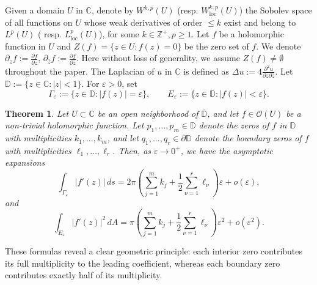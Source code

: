 \documentclass[12pt,twoside]{amsart}
\numberwithin{equation}{section}
\newtheorem{theorem}{Theorem}[section]
\numberwithin{definition}{section} %
\begin{document}
Given a domain $U$ in $\mathbb{C}$,  denote by $W ^{k,p}(U) $ (resp. $W_{\mathrm{loc}}^{k,p}(U)$) the Sobolev space of all functions on  $U$ whose weak derivatives of order $\leq k$ exist and belong to $L^p(U)$ (  resp. $L_{\mathrm{loc}}^p(U)$),   for some $k\in \mathbb{Z}^+,  p\geq 1$. Let $f$ be a holomorphic function in $U$  and $Z(f)= \{z \in U:  f(z) =0 \}$ be the zero set of $f$. We denote $ \partial_z f := \frac{\partial f}{\partial z}$,  $ \partial_{\bar{z}} f := \frac{\partial f}{\partial \bar{z}}$.   Here without loss of generality, we assume $Z(f) \neq \emptyset$ throughout the paper. The Laplacian of $u$ in $\mathbb{C}$ is defined as $\Delta u := 4 \frac{\partial^2 u}{\partial z \partial \bar{z}}.$ Let $\mathbb{D} := \{ z \in \mathbb{C} : |z| < 1 \}$. For $\varepsilon > 0$, set
$$
\Gamma_{\varepsilon} := \{z \in \mathbb{D} : |f(z)| = \varepsilon\}, \qquad
E_{\varepsilon} := \{z \in \mathbb{D} : |f(z)| < \varepsilon\}.
$$

\begin{theorem}\label{thm3.2}
Let $U \subset \mathbb{C}$ be an open neighborhood of $\overline{\mathbb{D}}$, and let $f \in \mathcal{O}(U)$ be a non-trivial holomorphic function. Let $p_1, \dots, p_m \in \mathbb{D}$ denote the zeros of $f$ in $\mathbb{D}$ with multiplicities $k_1, \dots, k_m$, and let $q_1, \dots, q_r \in \partial\mathbb{D}$ denote the boundary zeros of $f$ with multiplicities $\ell_1, \dots, \ell_r$. 
Then, as $\varepsilon \to 0^+$, we have the asymptotic expansions
\begin{equation}\label{eq:level-set-asymptotic}
\int_{\Gamma_{\varepsilon}} |f'(z)|\,ds = 2\pi \left( \sum_{j=1}^{m} k_{j} + \frac{1}{2} \sum_{\nu=1}^{r} \ell_{\nu} \right) \varepsilon + o(\varepsilon),
\end{equation}
and
\begin{equation}\label{eq:sublevel-energy-asymptotic}
\int_{E_{\varepsilon}} |f'(z)|^{2}\,dA = \pi \left( \sum_{j=1}^{m} k_{j} + \frac{1}{2} \sum_{\nu=1}^{r} \ell_{\nu} \right) \varepsilon^{2} + o(\varepsilon^{2}).
\end{equation}
\end{theorem}

These formulas reveal a clear geometric principle: each interior zero contributes its full multiplicity to the leading coefficient, whereas each boundary zero contributes exactly half of its multiplicity.
\end{document}
